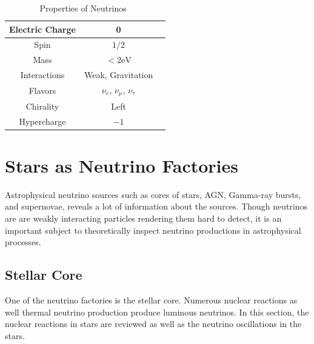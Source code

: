 \begin{table}[ht]
\centering
 \begin{tabular}{|c | c | c|} 
 \hline
  Electric Charge & 0\\
  \hline
  Spin & $1/2$ \\
\hline
 Mass & $<2\mathrm{eV}$  \\
 \hline
 Interactions & Weak, Gravitation  \\
 \hline
 Flavors & $\nu_e$, $\nu_\mu$, $\nu_\tau$ \\ 
 \hline
 Chirality & Left \\
 \hline
 Hypercharge & $-1$ \\
 \hline
 
 \end{tabular}
 \caption{Properties of Neutrinos~\cite{Patrignani:2016xqp}}
\label{table:neutrino-properties}
\end{table}

\section{\label{chap:basics-section:astro}Stars as Neutrino Factories}

Astrophysical neutrino sources such as cores of stars, AGN, Gamma-ray bursts, and supernovae, reveals a lot of information about the sources. Though neutrinos are are weakly interacting particles rendering them hard to detect, it is an important subject to theoretically inspect neutrino productions in astrophysical processes.


\subsection{Stellar Core}

One of the neutrino factories is the stellar core. Numerous nuclear reactions as well thermal neutrino production produce luminous neutrinos. In this section, the nuclear reactions in stars are reviewed as well as the neutrino oscillations in the stars.


